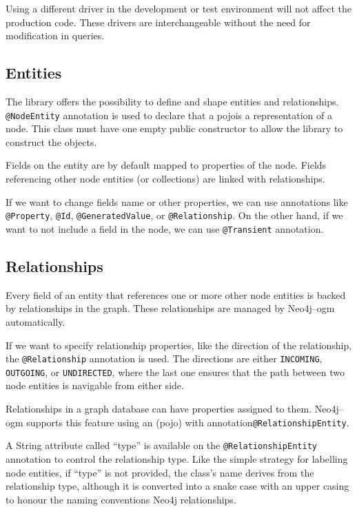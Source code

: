Using a different driver in the development or test environment will not affect the production code. These drivers are interchangeable without the need for modification in queries.

\subsection {Entities}

The library offers the possibility to define and shape entities and relationships.
\texttt{@NodeEntity} annotation is used to declare that a \acrfull{pojo}is a representation of a node.
This class must have one empty public constructor to allow the library to construct the objects.

Fields on the entity are by default mapped to properties of the node. Fields referencing other node entities (or collections) are linked with relationships.

If we want to change fields name or other properties, we can use annotations like \texttt{@Property}, \texttt{@Id}, \texttt{@GeneratedValue}, or \texttt{@Relationship}.
On the other hand, if we want to not include a field in the node, we can use \texttt{@Transient} annotation.

\subsection {Relationships}

Every field of an entity that references one or more other node entities is backed by relationships in the graph. These relationships are managed by Neo4j--\acrshort{ogm} automatically.

If we want to specify relationship properties, like the direction of the relationship, the \texttt{@Relationship} annotation is used.
The directions are either \texttt{INCOMING}, \texttt{OUTGOING}, or \texttt{UNDIRECTED}, where the last one ensures that the path between two node entities is navigable from either side.

Relationships in a graph database can have properties assigned to them. Neo4j--\acrshort{ogm} supports this feature using an (\acrshort{pojo}) with annotation\linebreak\texttt{@RelationshipEntity}.

A String attribute called ``type'' is available on the \texttt{@RelationshipEntity} annotation to control the relationship type.
Like the simple strategy for labelling node entities, if ``type'' is not provided, the class's name derives from the relationship type, although it is converted into a snake case with an upper casing to honour the naming conventions Neo4j relationships. \cite{neo4j_reference_nodate}

